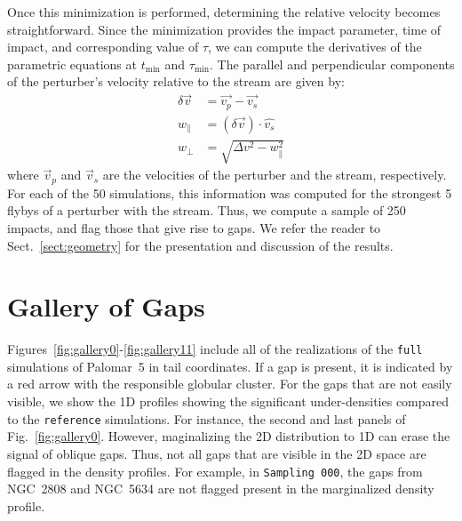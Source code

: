 \documentclass[draft]{aa}
\begin{document}
\begin{appendix}
      Once this minimization is performed, determining the relative velocity becomes straightforward. Since the minimization provides the impact parameter, time of impact, and corresponding value of $\tau$, we can compute the derivatives of the parametric equations at $t_{\text{min}}$ and $\tau_{\text{min}}$. The parallel and perpendicular components of the perturber's velocity relative to the stream are given by:
      \begin{equation}
        \begin{aligned}
          \delta \vec{v} &=\vec{v_p} - \vec{v_s} \\
          w_\parallel &= \left(\delta \vec{v}\right)\cdot \hat{v_s}\\  
          w_\perp &=  \sqrt{\Delta v ^2 - w_\parallel ^ 2}
          \end{aligned}
        \end{equation}
      where $\vec{v}_p$ and $\vec{v}_s$ are the velocities of the perturber and the stream, respectively. For each of the 50 simulations, this information was computed for the strongest 5 flybys of a perturber with the stream. Thus, we compute a sample of 250 impacts, and flag those that give rise to gaps. We refer the reader to Sect.~\ref{sect:geometry} for the presentation and discussion of the results.




  \section{Gallery of Gaps} \label{sec:gallery_of_gaps}
    Figures~\ref{fig:gallery0}-\ref{fig:gallery11} include all of the realizations of the \texttt{full} simulations of Palomar~5 in tail coordinates. If a gap is present, it is indicated by a red arrow with the responsible globular cluster. For the gaps that are not easily visible, we show the 1D profiles  showing the significant under-densities compared to the \texttt{reference} simulations. For instance, the second and last panels of Fig.~\ref{fig:gallery0}. However, maginalizing the 2D distribution to 1D can erase the signal of oblique gaps. Thus, not all gaps that are visible in the 2D space are flagged in the density profiles. For example, in \texttt{Sampling 000}, the gaps from NGC~2808 and NGC~5634 are not flagged present in the marginalized density profile.


\end{appendix}
\end{document}
